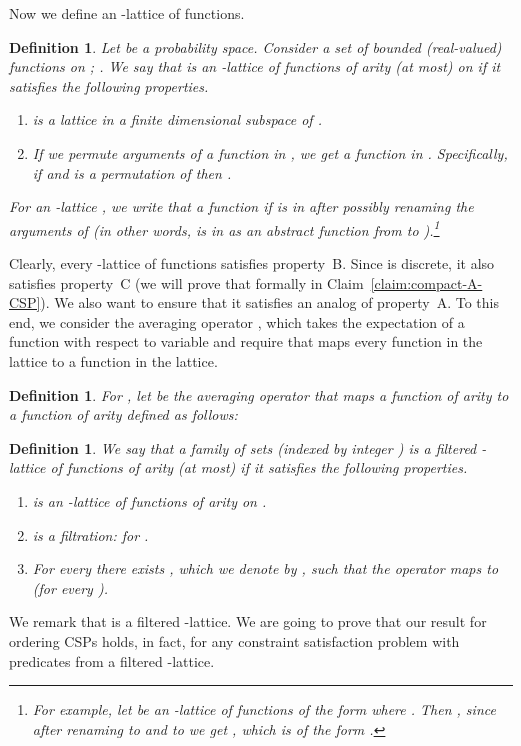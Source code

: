 \documentclass[11pt]{article}
\newtheorem{definition}[theorem]{Definition}
\begin{document}
Now we define an -lattice of functions.
\begin{definition}\label{def:A-lattice}
Let  be a probability space.
Consider a set  of bounded (real-valued) functions   on ; .
We say that  is an -lattice of functions of arity (at most)  on  if it satisfies the following properties.
\begin{enumerate}
\item  is a lattice in a finite dimensional subspace of .
\item If we permute arguments of a function in , we get a function in . Specifically, if  and  is a permutation of  then .
\end{enumerate}

For an -lattice , we write that a function  if  is in  after possibly renaming the arguments of 
(in other words,  is in  as an abstract function from  to ).\footnote{For example, let  be an -lattice of
functions of the form  where . Then , since after renaming  to  and  to  we get
, which is of the form  .}
\end{definition}
Clearly, every -lattice  of functions satisfies property~B. Since  is discrete, it also satisfies property~C (we will prove that formally in
Claim~\ref{claim:compact-A-CSP}). We also want to ensure that it satisfies an analog of property~A.
To this end, we consider the averaging operator , which takes the expectation of a function with respect to variable   and require
that  maps every function in the lattice to a function in the lattice.

\begin{definition}
For , let  be the averaging operator that maps a function  of arity  to a function  of arity  defined as follows:

\end{definition}
\begin{definition}
We say that a family of sets  (indexed by integer ) is a filtered -lattice of
functions of arity (at most)  if it satisfies the following properties.
\begin{enumerate}
\item  is an -lattice of functions of arity  on .
\item  is a filtration:  for .
\item For every  there exists , which we denote by , such that the operator  maps  to  (for every ).
\end{enumerate}
\end{definition}
We remark  that  is a filtered -lattice.
We are going to prove that our result for ordering CSPs holds, in fact, for any constraint satisfaction problem with predicates from a filtered -lattice.
\end{document}

